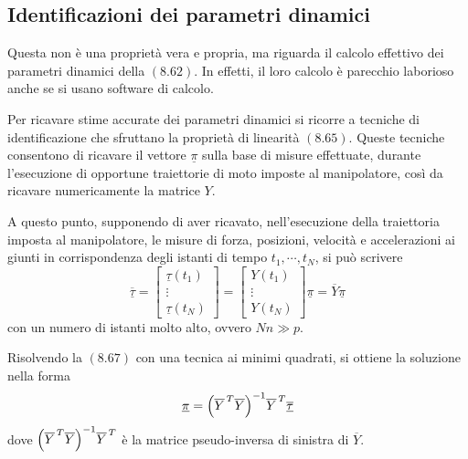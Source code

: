 \subsection{Identificazioni dei parametri dinamici}
Questa non è una proprietà vera e propria, ma riguarda il calcolo effettivo dei parametri dinamici della $(8.62)$. In effetti, il loro calcolo è parecchio laborioso anche se si usano software di calcolo.

Per ricavare stime accurate dei parametri dinamici si ricorre a tecniche di identificazione che sfruttano la proprietà di linearità $(8.65)$. Queste tecniche consentono di ricavare il vettore $\underline{\pi}$ sulla base di misure effettuate, durante l'esecuzione di opportune traiettorie di moto imposte al manipolatore, così da ricavare numericamente la matrice $Y$.

A questo punto, supponendo di aver ricavato, nell'esecuzione della traiettoria imposta al manipolatore, le misure di forza, posizioni, velocità e accelerazioni ai giunti in corrispondenza degli istanti di tempo $t_1, \cdots, t_N$, si può scrivere
\begin{equation}
	\overline{\underline{\tau}} = 
	\begin{bmatrix}
		\underline{\tau}(t_1) \\
		\vdots \\
		\underline{\tau}(t_N)
	\end{bmatrix}
	= 
	\begin{bmatrix}
		Y(t_1) \\
		\vdots \\
		Y(t_N)
	\end{bmatrix}
	\underline{\pi}
	= \overline{Y} \underline{\pi}
\end{equation}
con un numero di istanti molto alto, ovvero $Nn \gg p$.

Risolvendo la $(8.67)$ con una tecnica ai minimi quadrati, si ottiene la soluzione nella forma
\begin{equation}
	\underline{\pi} = \Bigl( \overline{Y}^{\,T} \overline{Y} \Bigr)^{-1}  \overline{Y}^{\,T} \overline{\underline{\tau}}
\end{equation}
dove $\Bigl( \overline{Y}^{\,T} \overline{Y} \Bigr)^{-1}  \overline{Y}^{\,T}$ è la matrice pseudo-inversa di sinistra di $\overline{Y}$.